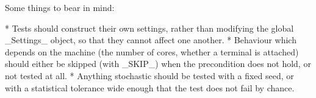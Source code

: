 	Some things to bear in mind:

	* Tests should construct their own settings, rather than modifying the global _Settings_ object, so that they cannot affect one another.
	* Behaviour which depends on the machine (the number of cores, whether a terminal is attached) should either be skipped (with _SKIP_) when the precondition does not hold, or not tested at all.
	* Anything stochastic should be tested with a fixed seed, or with a statistical tolerance wide enough that the test does not fail by chance.

